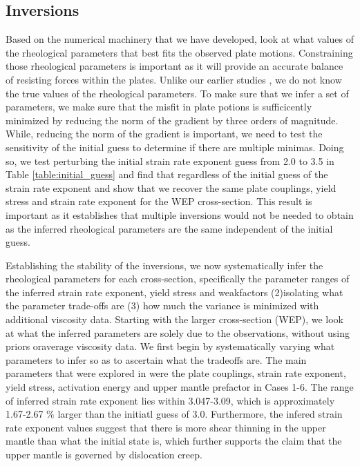 \documentclass[12pt]{article}
\begin{document}
{\subsection{Inversions}
Based on the numerical machinery that we have developed, look at what values of the rheological parameters that best fits the observed plate motions. Constraining those rheological parameters is important as it will provide an accurate balance of resisting forces within the plates. 
 Unlike our earlier studies \citep{ratnaswamy2015adjoint}, we do not know the true values of the rheological parameters. To make sure that we infer a set of parameters, we make sure that the misfit in plate potions is sufficicently minimized by reducing the norm of the gradient by three orders of magnitude. While, reducing the norm of the gradient is important, we need to test the sensitivity of the initial guess to determine if there are multiple minimas. Doing so, we test perturbing the initial strain rate exponent guess from 2.0 to 3.5  in Table \ref{table:initial_guess} and find that regardless of the initial guess of the strain rate exponent and show that we recover the same plate couplings, yield stress and strain rate exponent for the WEP cross-section. This result is important as it establishes that multiple inversions would not be needed to obtain as the inferred rheological parameters are the same independent of the initial guess. 
 
Establishing the stability of the inversions, we now systematically infer the rheological parameters for each cross-section, specifically the parameter ranges of the inferred strain rate exponent, yield stress and weakfactors (2)isolating what the parameter trade-offs are (3) how much the variance is minimized with additional viscosity data. Starting with the larger cross-section (WEP), we look at what the inferred parameters are solely due to the observations, without using priors oraverage viscosity data. We first begin by systematically varying what parameters to infer so as to ascertain what the tradeoffs are.  The main parameters that were explored in \citep{ratnaswamy2015adjoint} were the plate couplings, strain rate exponent, yield stress, activation energy and upper mantle prefactor in Cases 1-6. The range of inferred strain rate exponent lies within  3.047-3.09, which is approximately 1.67-2.67 $\%$ larger than the initiatl guess of 3.0. Furthermore, the infered strain rate exponent values suggest that there is more shear thinning in the upper mantle than what the initial state is, which further supports the claim that the upper mantle is governed by dislocation creep. 

}
\end{document}
